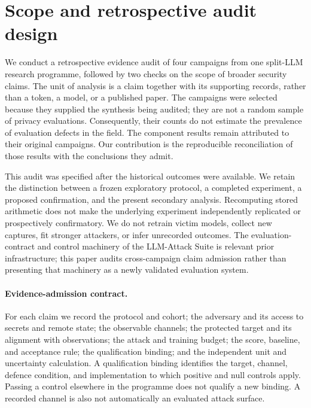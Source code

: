 \section{Scope and retrospective audit design}
\label{sec:design}

We conduct a retrospective evidence audit of four campaigns from one
split-LLM research programme, followed by two checks on the scope of broader
security claims. The unit of analysis is a claim together with its supporting
records, rather than a token, a model, or a published paper. The campaigns
were selected because they supplied the synthesis being audited; they are
not a random sample of privacy evaluations. Consequently, their counts do
not estimate the prevalence of evaluation defects in the field. The
component results remain attributed to their original campaigns. Our
contribution is the reproducible reconciliation of those results with the
conclusions they admit.

This audit was specified after the historical outcomes were available. We
retain the distinction between a frozen exploratory protocol, a completed
experiment, a proposed confirmation, and the present secondary analysis.
Recomputing stored arithmetic does not make the underlying experiment
independently replicated or prospectively confirmatory. We do not retrain
victim models, collect new captures, fit stronger attackers, or infer
unrecorded outcomes. The evaluation-contract and control machinery of the
LLM-Attack Suite is relevant prior infrastructure\citep{suite2026}; this
paper audits cross-campaign claim admission rather than presenting that
machinery as a newly validated evaluation system.

\paragraph{Evidence-admission contract.}
For each claim we record the protocol and cohort; the adversary and its
access to secrets and remote state; the observable channels; the protected
target and its alignment with observations; the attack and training budget;
the score, baseline, and acceptance rule; the qualification binding; and the
independent unit and uncertainty calculation. A qualification binding
identifies the target, channel, defence condition, and implementation to
which positive and null controls apply. Passing a control elsewhere in the
programme does not qualify a new binding. A recorded channel is also not
automatically an evaluated attack surface.

